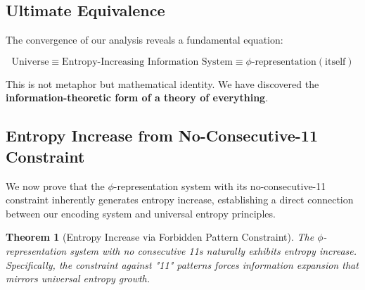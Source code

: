 \documentclass[12pt,letterpaper]{article}
\newtheorem{theorem}{Theorem}[section]
\begin{document}
\subsection{Ultimate Equivalence}

The convergence of our analysis reveals a fundamental equation:

$$\text{Universe} \equiv \text{Entropy-Increasing Information System} \equiv \phi\text{-representation}(\text{itself})$$

This is not metaphor but mathematical identity. We have discovered the \textbf{information-theoretic form of a theory of everything}.

\subsection{Entropy Increase from No-Consecutive-11 Constraint}

We now prove that the $\phi$-representation system with its no-consecutive-11 constraint inherently generates entropy increase, establishing a direct connection between our encoding system and universal entropy principles.

\begin{theorem}[Entropy Increase via Forbidden Pattern Constraint]
\label{thm:entropy_no_11}
The $\phi$-representation system with no consecutive 11s naturally exhibits entropy increase. Specifically, the constraint against "11" patterns forces information expansion that mirrors universal entropy growth.
\end{theorem}
\end{document}
